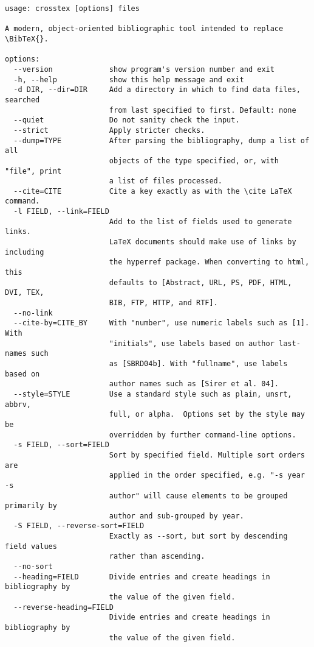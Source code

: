 \documentclass{article}
\newcommand{\BibTeX}{\textsc{Bib}\TeX}
\begin{document}
\begin{small}\begin{verbatim}
usage: crosstex [options] files

A modern, object-oriented bibliographic tool intended to replace \BibTeX{}.

options:
  --version             show program's version number and exit
  -h, --help            show this help message and exit
  -d DIR, --dir=DIR     Add a directory in which to find data files, searched
                        from last specified to first. Default: none
  --quiet               Do not sanity check the input.
  --strict              Apply stricter checks.
  --dump=TYPE           After parsing the bibliography, dump a list of all
                        objects of the type specified, or, with "file", print
                        a list of files processed.
  --cite=CITE           Cite a key exactly as with the \cite LaTeX command.
  -l FIELD, --link=FIELD
                        Add to the list of fields used to generate links.
                        LaTeX documents should make use of links by including
                        the hyperref package. When converting to html, this
                        defaults to [Abstract, URL, PS, PDF, HTML, DVI, TEX,
                        BIB, FTP, HTTP, and RTF].
  --no-link             
  --cite-by=CITE_BY     With "number", use numeric labels such as [1]. With
                        "initials", use labels based on author last-names such
                        as [SBRD04b]. With "fullname", use labels based on
                        author names such as [Sirer et al. 04].
  --style=STYLE         Use a standard style such as plain, unsrt, abbrv,
                        full, or alpha.  Options set by the style may be
                        overridden by further command-line options.
  -s FIELD, --sort=FIELD
                        Sort by specified field. Multiple sort orders are
                        applied in the order specified, e.g. "-s year -s
                        author" will cause elements to be grouped primarily by
                        author and sub-grouped by year.
  -S FIELD, --reverse-sort=FIELD
                        Exactly as --sort, but sort by descending field values
                        rather than ascending.
  --no-sort             
  --heading=FIELD       Divide entries and create headings in bibliography by
                        the value of the given field.
  --reverse-heading=FIELD
                        Divide entries and create headings in bibliography by
                        the value of the given field.

\end{verbatim}
\end{small}
\end{document}
